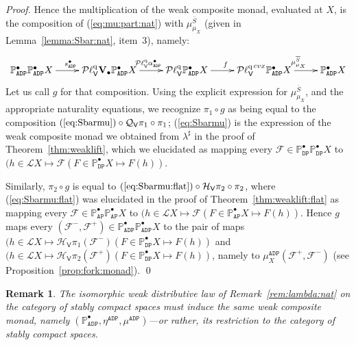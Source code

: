 \documentclass[preprint,12pt]{elsarticle}
\newcommand\Lform{\mathcal L}
\newcommand\Pred{\mathbb{P}}
\newcommand\Angel{{\mathtt{A}}}
\newcommand\Demon{{\mathtt{D}}}
\newcommand\Nature{{\mathtt{P}}}
\newcommand\AN{{\Angel\Nature}}
\newcommand\DN{{\Demon\Nature}}
\newcommand\ADN{{\Angel\Demon\Nature}}
\newcommand\Smyth{{\mathcal Q}}
\newcommand\Hoare{{\mathcal H}}
\newcommand\Vt{\mathsf{V}}
\newcommand\HV{\Hoare_\Vt}
\newcommand\SV{\Smyth_{\Vt}}
\newcommand\quasi{\mathrm{q}} %
\newcommand\QL{\Plotkin^\quasi}
\newcommand\QLV{\QL_\Vt}
\newcommand\Plotkin{\mathcal P\ell} %
\newcommand\Val{{\mathbf V}}
\newtheorem{remark}[theorem]{Remark}
\begin{document}
\begin{proof}
  Hence the multiplication of the weak composite monad, evaluated at
  $X$, is the composition of (\ref{eq:mu:part:nat}) with
  $\mu^{\overline S}_{\mu_X}$ (given in Lemma~\ref{lemma:Sbar:nat},
  item~3), namely:
  \[
    \xymatrix{
      \Pred_\ADN^\bullet {\Pred_\ADN^\bullet X}
      \ar[r]^{s_\ADN^\bullet}
      & \QLV {\Val_\bullet {\Pred_\ADN^\bullet X}}
      \ar[r]^{\QLV {\alpha_\ADN^\bullet}}
      & \QLV {\Pred_\ADN^\bullet X}
      \ar[r]^f
      & {\QLV}^{cvx} {\Pred_\ADN^\bullet X}
      \ar[r]^{\mu^{\overline S}_{\mu_X}}
      & \Pred_\ADN^\bullet X
    }
  \]
  Let us call $g$ for that composition.  Using the explicit expression
  for $\mu^{\overline S}_{\mu_X}$, and the appropriate naturality
  equations, we recognize $\pi_1 \circ g$ as being equal to the
  composition $(\ref{eq:Sbarmu}) \circ \SV {\pi_1} \circ \pi_1$;
  (\ref{eq:Sbarmu}) is the expression of the weak composite monad we
  obtained from $\lambda^\sharp$ in the proof of
  Theorem~\ref{thm:weaklift}, which we elucidated as mapping every
  $\mathcal F \in \Pred_\DN^\bullet {\Pred_\DN^\bullet X}$ to
  $(h \in \Lform X \mapsto \mathcal F (F \in \Pred_\DN^\bullet X
  \mapsto F (h))$.

  Similarly, $\pi_2 \circ g$ is equal to
  $(\ref{eq:Sbarmu:flat}) \circ \HV {\pi_2} \circ \pi_2$, where
  (\ref{eq:Sbarmu:flat}) was elucidated in the proof of
  Theorem~\ref{thm:weaklift:flat} as mapping every
  $\mathcal F \in \Pred_\AN^\bullet {\Pred_\AN^\bullet X}$ to
  $(h \in \Lform X \mapsto \mathcal F (F \in \Pred_\AN^\bullet X
  \mapsto F (h))$.  Hence $g$ maps every
  $(\mathcal F^-, \mathcal F^+) \in \Pred_\ADN^\bullet
  {\Pred_\ADN^\bullet X}$ to the pair of maps
  $(h \in \Lform X \mapsto \HV {\pi_1} (\mathcal F^-) (F \in
  \Pred_\DN^\bullet X \mapsto F (h))$ and
  $(h \in \Lform X \mapsto \HV {\pi_2} (\mathcal F^+) (F \in
  \Pred_\DN^\bullet X \mapsto F (h))$, namely to
  $\mu^\ADN_X (\mathcal F^+, \mathcal F^-)$ (see
  Proposition~\ref{prop:fork:monad}).  \qed
\end{proof}

\begin{remark}
  \label{rem:weaklift:nat}
  The isomorphic weak distributive law of Remark~\ref{rem:lambda:nat}
  on the category of stably compact spaces must induce the same weak
  composite monad, namely
  $(\Pred_\ADN^\bullet, \eta^\ADN, \mu^\ADN)$---or rather, its
  restriction to the category of stably compact spaces.
\end{remark}
\end{document}
